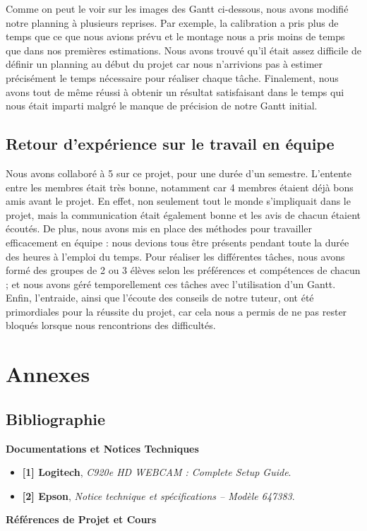 \documentclass[10pt]{article} %
\begin{document}
Comme on peut le voir sur les images des Gantt ci-dessous, nous avons modifié notre planning à plusieurs reprises. Par exemple, la calibration a pris plus de temps que ce que nous avions prévu et le montage nous a pris moins de temps que dans nos premières estimations. Nous avons trouvé qu'il était assez difficile de définir un planning au début du projet car nous n'arrivions pas à estimer précisément le temps nécessaire pour réaliser chaque tâche. Finalement, nous avons tout de même réussi à obtenir un résultat satisfaisant dans le temps qui nous était imparti malgré le manque de précision de notre Gantt initial.

\subsection{Retour d'expérience sur le travail en équipe}
Nous avons collaboré à 5 sur ce projet, pour une durée d'un semestre. L'entente entre les membres était très bonne, notamment car 4 membres étaient déjà bons amis avant le projet. En effet, non seulement tout le monde s'impliquait dans le projet, mais la communication était également bonne et les avis de chacun étaient écoutés. De plus, nous avons mis en place des méthodes pour travailler efficacement en équipe : nous devions tous être présents pendant toute la durée des heures à l'emploi du temps. Pour réaliser les différentes tâches, nous avons formé des groupes de 2 ou 3 élèves selon les préférences et compétences de chacun ; et nous avons géré temporellement ces tâches avec l'utilisation d'un Gantt. Enfin, l'entraide, ainsi que l'écoute des conseils de notre tuteur, ont été primordiales pour la réussite du projet, car cela nous a permis de ne pas rester bloqués lorsque nous rencontrions des difficultés.

 
\section{Annexes}
\subsection{Bibliographie}
\textbf{Documentations et Notices Techniques}

\begin{itemize}
    \item \textbf{[1] Logitech}, \textit{C920e HD WEBCAM : Complete Setup Guide}.
    \item \textbf{[2] Epson}, \textit{Notice technique et spécifications – Modèle 647383}.
\end{itemize}
\textbf{Références de Projet et Cours}
\end{document}
